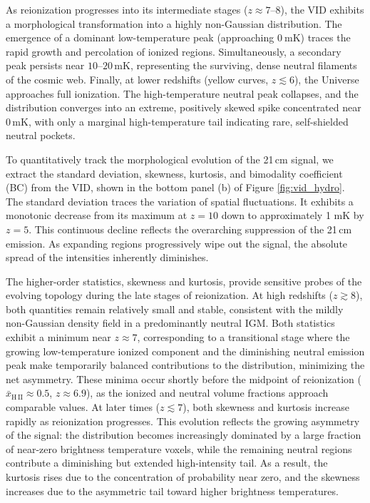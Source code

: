 \documentclass[apj,twocolumn, appendixfloats, twocolappendix, numberedappendix, tighten]{openjournal}
\begin{document}
As reionization progresses into its intermediate stages ($z \approx 7$--$8$), the VID exhibits a morphological transformation into a highly non-Gaussian distribution. The emergence of a dominant low-temperature peak (approaching $0 \ \mathrm{mK}$) traces the rapid growth and percolation of ionized regions. Simultaneously, a secondary peak persists near $10$--$20 \, \mathrm{mK}$, representing the surviving, dense neutral filaments of the cosmic web. Finally, at lower redshifts (yellow curves, $z \lesssim 6$), the Universe approaches full ionization. The high-temperature neutral peak collapses, and the distribution converges into an extreme, positively skewed spike concentrated near $0 \, \mathrm{mK}$, with only a marginal high-temperature tail indicating rare, self-shielded neutral pockets.


To quantitatively track the morphological evolution of the 21\,cm signal, we extract the standard deviation, skewness, kurtosis, and bimodality coefficient (BC) from the VID, shown in the bottom panel (b) of Figure \ref{fig:vid_hydro}. The standard deviation traces the variation of spatial fluctuations. It exhibits a monotonic decrease from its maximum at $z=10$ down to approximately 1 mK by $z=5$. This continuous decline reflects the overarching suppression of the 21\,cm emission. As expanding  regions progressively wipe out the signal, the absolute spread of the intensities inherently diminishes.


The higher-order statistics, skewness and kurtosis, provide sensitive probes of the evolving topology during the late stages of reionization. At high redshifts ($z \gtrsim 8$), both quantities remain relatively small and stable, consistent with the mildly non-Gaussian density field in a predominantly neutral IGM. Both statistics exhibit a minimum near $z \approx 7$, corresponding to a transitional stage where the growing low-temperature ionized component and the diminishing neutral emission peak make temporarily balanced contributions to the distribution, minimizing the net asymmetry. These minima occur shortly before the midpoint of reionization ($\bar{x}_\mathrm{H\,II} \approx 0.5$, $z \approx 6.9$), as the ionized and neutral volume fractions approach comparable values. At later times ($z \lesssim 7$), both skewness and kurtosis increase rapidly as reionization progresses. This evolution reflects the growing asymmetry of the signal: the distribution becomes increasingly dominated by a large fraction of near-zero brightness temperature voxels, while the remaining neutral regions contribute a diminishing but extended high-intensity tail. As a result, the kurtosis rises due to the concentration of probability near zero, and the skewness increases due to the asymmetric tail toward higher brightness temperatures.
\end{document}
